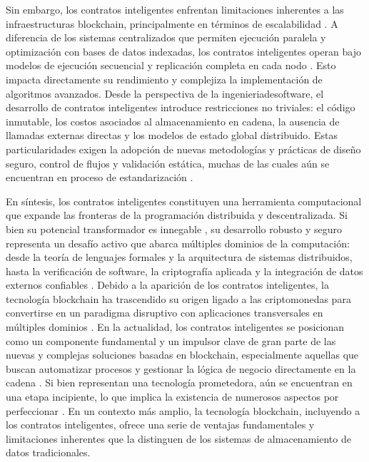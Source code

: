 Sin embargo, los contratos inteligentes enfrentan limitaciones inherentes a las infraestructuras blockchain, principalmente en términos de escalabilidad \cite{kalajdjieski2023databases}. A diferencia de los sistemas centralizados que permiten ejecución paralela y optimización con bases de datos indexadas, los contratos inteligentes operan bajo modelos de ejecución secuencial y replicación completa en cada nodo \cite{taherdoost2023smart}. Esto impacta directamente su rendimiento y complejiza la implementación de algoritmos avanzados. Desde la perspectiva de la \gls{ingenieriadesoftware}, el desarrollo de contratos inteligentes introduce restricciones no triviales: el código inmutable, los costos asociados al almacenamiento en cadena, la ausencia de llamadas externas directas y los modelos de estado global distribuido. Estas particularidades exigen la adopción de nuevas metodologías y prácticas de diseño seguro, control de flujos y validación estática, muchas de las cuales aún se encuentran en proceso de estandarización \cite{taherdoost2023smart, cepal2021economia}.

En síntesis, los contratos inteligentes constituyen una herramienta computacional que expande las fronteras de la programación distribuida y descentralizada. Si bien su potencial transformador es innegable \cite{taherdoost2023smart}, su desarrollo robusto y seguro representa un desafío activo que abarca múltiples dominios de la computación: desde la teoría de lenguajes formales \cite{hoskinson2017we} y la arquitectura de sistemas distribuidos, hasta la verificación de software, la criptografía aplicada y la integración de datos externos confiables \cite{taherdoost2023smart}. Debido a la aparición de los contratos inteligentes, la tecnología blockchain ha trascendido su origen ligado a las \glspl{criptomoneda} para convertirse en un paradigma disruptivo con aplicaciones transversales en múltiples dominios \cite{bartolomeo2020introduccion, vaigandla2023review}. En la actualidad, los contratos inteligentes se posicionan como un componente fundamental y un impulsor clave de gran parte de las nuevas y complejas soluciones basadas en blockchain, especialmente aquellas que buscan automatizar procesos y gestionar la lógica de negocio directamente en la cadena \cite{sharabati2024blockchain}. Si bien representan una tecnología prometedora, aún se encuentran en una etapa incipiente, lo que implica la existencia de numerosos aspectos por perfeccionar \cite{taherdoost2023smart}. En un contexto más amplio, la tecnología blockchain, incluyendo a los contratos inteligentes, ofrece una serie de ventajas fundamentales y limitaciones inherentes que la distinguen de los sistemas de almacenamiento de datos tradicionales.

